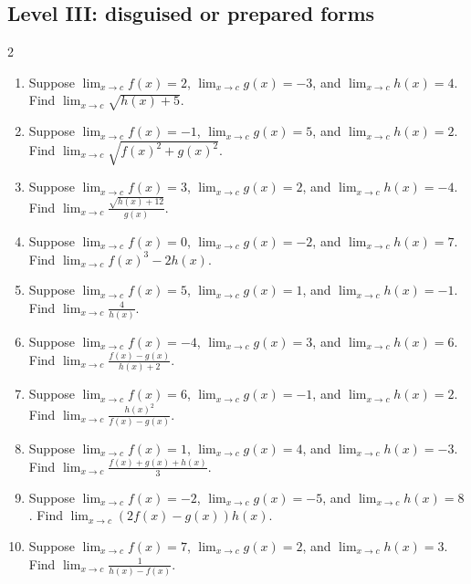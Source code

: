 \documentclass[11pt,oneside]{book}
\begin{document}
\subsection*{Level III: disguised or prepared forms}
\begin{multicols}{2}
\begin{enumerate}[leftmargin=*,label=\textbf{\arabic*.},itemsep=0.65\baselineskip]
\item Suppose $\lim_{x\to c} f(x)=2$, $\lim_{x\to c} g(x)=-3$, and $\lim_{x\to c} h(x)=4$. Find $\displaystyle\lim_{x\to c} \sqrt{h(x)+5}$.
\item Suppose $\lim_{x\to c} f(x)=-1$, $\lim_{x\to c} g(x)=5$, and $\lim_{x\to c} h(x)=2$. Find $\displaystyle\lim_{x\to c} \sqrt{f(x)^2+g(x)^2}$.
\item Suppose $\lim_{x\to c} f(x)=3$, $\lim_{x\to c} g(x)=2$, and $\lim_{x\to c} h(x)=-4$. Find $\displaystyle\lim_{x\to c} \frac{\sqrt{h(x)+12}}{g(x)}$.
\item Suppose $\lim_{x\to c} f(x)=0$, $\lim_{x\to c} g(x)=-2$, and $\lim_{x\to c} h(x)=7$. Find $\displaystyle\lim_{x\to c} f(x)^3-2h(x)$.
\item Suppose $\lim_{x\to c} f(x)=5$, $\lim_{x\to c} g(x)=1$, and $\lim_{x\to c} h(x)=-1$. Find $\displaystyle\lim_{x\to c} \frac{4}{h(x)}$.
\item Suppose $\lim_{x\to c} f(x)=-4$, $\lim_{x\to c} g(x)=3$, and $\lim_{x\to c} h(x)=6$. Find $\displaystyle\lim_{x\to c} \frac{f(x)-g(x)}{h(x)+2}$.
\item Suppose $\lim_{x\to c} f(x)=6$, $\lim_{x\to c} g(x)=-1$, and $\lim_{x\to c} h(x)=2$. Find $\displaystyle\lim_{x\to c} \frac{h(x)^2}{f(x)-g(x)}$.
\item Suppose $\lim_{x\to c} f(x)=1$, $\lim_{x\to c} g(x)=4$, and $\lim_{x\to c} h(x)=-3$. Find $\displaystyle\lim_{x\to c} \frac{f(x)+g(x)+h(x)}{3}$.
\item Suppose $\lim_{x\to c} f(x)=-2$, $\lim_{x\to c} g(x)=-5$, and $\lim_{x\to c} h(x)=8$. Find $\displaystyle\lim_{x\to c} \left(2f(x)-g(x)\right)h(x)$.
\item Suppose $\lim_{x\to c} f(x)=7$, $\lim_{x\to c} g(x)=2$, and $\lim_{x\to c} h(x)=3$. Find $\displaystyle\lim_{x\to c} \frac{1}{h(x)-f(x)}$.
\end{enumerate}
\end{multicols}
\end{document}
